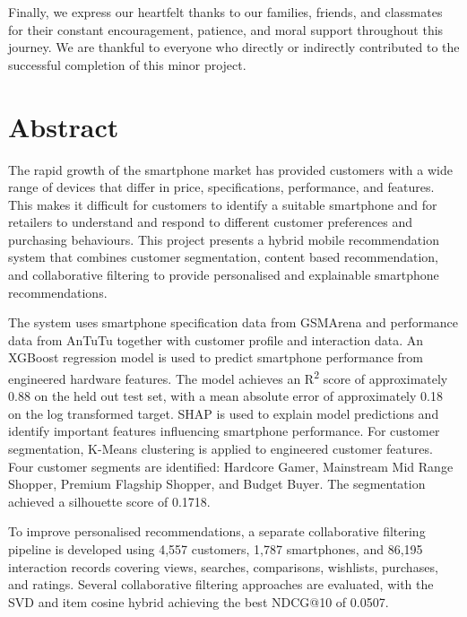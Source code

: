 \documentclass[12pt]{report}
\numberwithin{figure}{chapter}
\numberwithin{table}{chapter}
\numberwithin{equation}{chapter}
\begin{document}
Finally, we express our heartfelt thanks to our families, friends, and classmates for their constant encouragement, patience, and moral support throughout this journey. We are thankful to everyone who directly or indirectly contributed to the successful completion of this minor project.


\chapter*{Abstract}
The rapid growth of the smartphone market has provided customers with a wide range of devices that differ in price, specifications, performance, and features. This makes it difficult for customers to identify a suitable smartphone and for retailers to understand and respond to different customer preferences and purchasing behaviours. This project presents a hybrid mobile recommendation system that combines customer segmentation, content based recommendation, and collaborative filtering to provide personalised and explainable smartphone recommendations.

The system uses smartphone specification data from GSMArena and performance data from AnTuTu together with customer profile and interaction data. An XGBoost regression model is used to predict smartphone performance from engineered hardware features. The model achieves an R\textsuperscript{2} score of approximately 0.88 on the held out test set, with a mean absolute error of approximately 0.18 on the log transformed target. SHAP is used to explain model predictions and identify important features influencing smartphone performance. For customer segmentation, K-Means clustering is applied to engineered customer features. Four customer segments are identified: Hardcore Gamer, Mainstream Mid Range Shopper, Premium Flagship Shopper, and Budget Buyer. The segmentation achieved a silhouette score of 0.1718.

To improve personalised recommendations, a separate collaborative filtering pipeline is developed using 4,557 customers, 1,787 smartphones, and 86,195 interaction records covering views, searches, comparisons, wishlists, purchases, and ratings. Several collaborative filtering approaches are evaluated, with the SVD and item cosine hybrid achieving the best NDCG@10 of 0.0507. 
\end{document}
